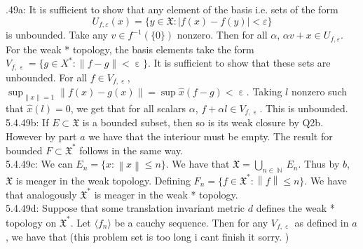 \documentclass[letterpaper]{article}
\DeclareMathOperator{\N}{\mathbb{N}}
\DeclareMathOperator{\ep}{\varepsilon}
\newcommand{\lan}{\langle}
\newcommand{\ran}{\rangle}
\newcommand{\norm}[1]{\left\lVert#1\right\rVert}
\newcommand{\inn}[1]{\lan#1\ran}
\newcommand{\X}{\mathfrak{X}}
\begin{document}
 .49a: It is sufficient to show that any element of the basis i.e. sets of the form 
$$U_{f, \varepsilon}(x) = \{y\in \X : |f(x)-f(y)|< \varepsilon\}$$ is unbounded. Take any $v\in f^{-1}(\{0\})$ nonzero. Then for all $\alpha$, $\alpha v+ x\in U_{f, \varepsilon}$.
For the weak * topology, the basis elements take the form $V_{f, \ep} =\{g\in X^\ast : \norm{f-g} < \ep\}.$
It is sufficient to show that these sets are unbounded. For all $f\in V_{f, \ep }$, $\sup_{\norm{x} = 1} \norm{f(x)- g(x)} = \sup{\hat{x} (f-g)}<\ep$.
Taking $l$ nonzero such that $\hat{x}(l) =0$, we get that for all scalars $\alpha$, $f+ \alpha l \in V_{f,\ep}$. This is unbounded. 
\newline \\ 5.4.49b: If $E \subset \X$ is a bounded subset, then so is its weak closure by Q2b. However by part $a$ we have that the interiour must be empty. The result for bounded $F \subset \X^\ast$ follows in the same way. 
\newline \\ 5.4.49c: We can $E_n = \{x: \norm{x}\leq n\}$. We have that $\X = \bigcup_{n\in \N} E_n$. Thus by $b$, $\X$ is meager in the weak topology. 
Defining $F_n = \{f\in \X^\ast : \norm{f}\leq n \}$. We have that analogously $\X^\ast$ is meager in the weak * topology. 
\newline \\ 5.4.49d: Suppose that some translation invariant metric $d$ defines the weak * topology on $\X^\ast$. Let $\inn{f_n}$ be a cauchy sequence. Then for any $V_{f, \ep}$ as defined in $a$, we have that (this problem set is too long i cant finish it sorry. )
\end{document}
